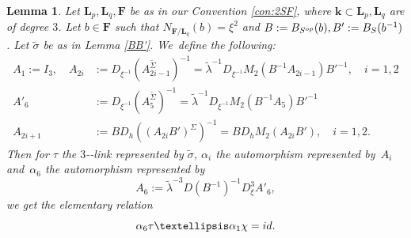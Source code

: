 \documentclass[10pt,a4paper]{amsart}
\providecommand{\nobreakdash}{\nobreak\hbox{-}}
\newcommand{\id}{\textup{id}}
\newcommand{\op}{\textup{op}}
\newtheorem{lemma}[theorem]{Lemma}
\theoremstyle{definition}
\newcommand{\kk}{{\boldsymbol{k}}}
\newcommand{\FF}{{\boldsymbol{F}}}
\newcommand{\LL}{{\boldsymbol{L}}}
\begin{document}
\begin{lemma} \label{HardRel}
Let $\LL_p, \LL_q,\FF$ be as in our Convention \ref{con:2SF}, where $\kk \subset \LL_p, \LL_q$ are of degree $3$. Let $b \in \FF$ such that $N_{\FF/\LL_q}(b) = \xi^2$ and $B:= B_{S^{\op}}(b), B':= B_S(b^{-1})$. Let $\tilde \sigma$ be as in Lemma \ref{BB'}. We~define the following:
\begin{align*}
A_1 := I_3, \quad A_{2i} &:= D_{\xi^{-1}} (A_{2i-1}^{\tilde \Sigma})^{-1} = \tilde \lambda^{-1} D_{\xi^{-1}} M_2(B^{-1} A_{2i - 1})B'^{-1}, \quad i = 1,2
\\
A'_{6} &:= D_{\xi^{-1}} (A_{5}^{\tilde \Sigma})^{-1} = \tilde \lambda^{-1} D_{\xi^{-1}} M_2(B^{-1} A_{5})B'^{-1}
\\
\tag*{and}
A_{2i + 1} &:= B D_h ((A_{2i}B')^{\Sigma})^{-1} = B D_h M_2(A_{2i}B'), \quad i=1,2.
\end{align*}
Then for $\tau$ the $3$\nobreakdash-link represented by $\tilde \sigma$, $\alpha_i$ the automorphism represented by~$A_i$ and~$\alpha_6$ the automorphism represented by\vspace*{-3pt}
\[
A_6 := \tilde \lambda^{-3}D(B^{-1})^{-1}D_{\xi}^3 A'_6,
\]
we get the elementary relation\vspace*{-3pt}
\[
\alpha_6 \tau \dots \alpha_1 \chi = \id.
\]
\end{lemma}
\end{document}
